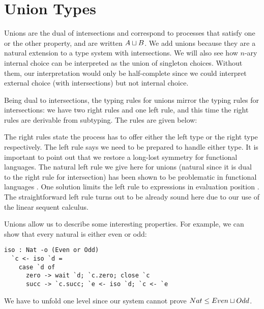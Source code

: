 
\section{Union Types}

Unions are the dual of intersections and correspond to processes that satisfy one or the other property, and are written $A \mathbin{\sqcup} B$. We add unions because they are a natural extension to a  type system with intersections. We will also see how $n$-ary internal choice can be interpreted as
the union of singleton choices. Without them, our interpretation would only be half-complete since we could interpret external choice (with intersections) but not internal choice.

Being dual to intersections, the typing rules for unions mirror the typing rules for intersections: we have two right rules and one left rule, and this time the right rules are derivable from subtyping. The rules are given below:


The right rules state the process has to offer either the left type or the right type respectively. The left rule says we need to be prepared to handle either type. It is important to point out that we restore a long-lost symmetry for functional languages. The natural left rule we give here for unions (natural since it is dual to the right rule for intersection) has been shown to be problematic in functional languages \cite{Barbanera95ic}. One solution limits the left rule to expressions in evaluation position \cite{DunfieldP04}. The straightforward left rule turns out to be already sound here due to our use of the linear sequent calculus.

Unions allow us to describe some interesting properties. For example, we can show that every natural is either even or odd:
\begin{lstlisting}[language=krill, style=custom]
  iso : Nat -o (Even or Odd)
  `c <- iso `d =
    case `d of
      zero -> wait `d; `c.zero; close `c
      succ -> `c.succ; `e <- iso `d; `c <- `e
\end{lstlisting}
We have to unfold one level since our system cannot prove $Nat \le Even \mathbin{\sqcup} Odd$. 

